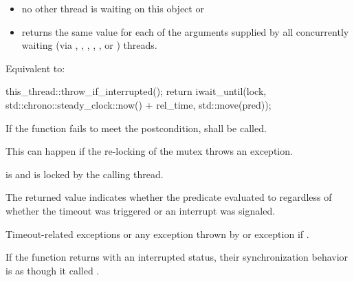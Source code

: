 {\begin{itemdescr}
        \begin{itemize}
        \item no other thread is waiting on this  object or
        \item {} returns the same value for each of the 
                arguments supplied by all concurrently waiting (via ,
                , 
                {\color{insertcolor}, , , or }) threads.
        \end{itemize}

{\color{diffcolor}
 \pnum \effects Equivalent to:
\begin{codeblock}
this_thread::throw_if_interrupted();
return iwait_until(lock,
                   std::chrono::steady_clock::now() + rel_time,
                   std::move(pred));
\end{codeblock}
}%

 \pnum \remarks
        If the function fails to meet the postcondition, 
        shall be called.
        \begin{note} This can happen if the re-locking of the mutex throws an exception. \end{note}

 \pnum \postconditions {} is  and 
        is locked by the calling thread.

 \pnum \begin{note} The returned value indicates whether the predicate evaluated to
         regardless of whether the timeout was triggered
        {\color{diffcolor} or an interrupt was signaled}. \end{note}

 \pnum \throws Timeout-related exceptions or any exception thrown by 
                {\color{diffcolor}or exception  if
                 }.

{\color{diffcolor}
 \pnum\sync If the function returns with an interrupted status, 
                their synchronization behavior is as though it called .
}%
\end{itemdescr}



}
